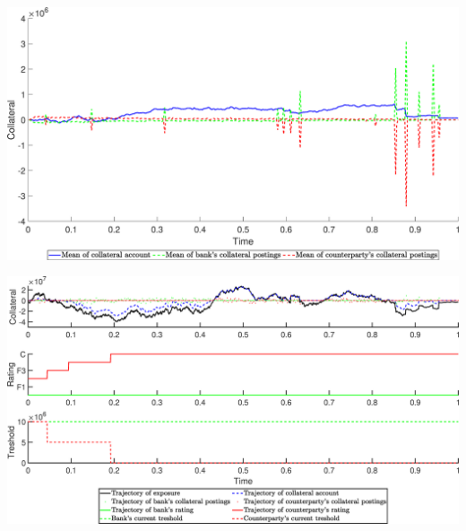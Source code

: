 \begin{landscape}
\includegraphics[width=.95\columnwidth]{CollateralRT/CollateralRT_FOBB_1}
\end{landscape}
\begin{landscape}
\includegraphics[width=.95\columnwidth]{CollateralRT/CollateralRT_FOBB_2}
\end{landscape}
